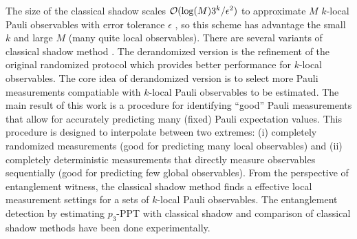 \documentclass[
aps,
pra,
twocolumn,
floatfix,
]{revtex4-2}
\theoremstyle{plain}
\theoremstyle{definition}
\newcommand{\dm}{\rho}
\begin{document}
The size of the classical shadow scales $\mathcal{O}(\log(M) 3^k/\epsilon^2)$ to approximate $M$ $k$-local Pauli observables with error tolerance $\epsilon$ \cite{huangPredictingManyProperties2020},
so this scheme has advantage the small $k$ and large $M$ (many quite local observables).
There are several variants of classical shadow method \cite{hadfieldMeasurementsQuantumHamiltonians2022, huangEfficientEstimationPauli2021, chenRobustShadowEstimation2021}.
The derandomized version \cite{huangEfficientEstimationPauli2021} is the refinement of the original randomized protocol which provides better performance for $k$-local observables. 
The core idea of derandomized version is to select more Pauli measurements compatiable with $k$-local Pauli observables to be estimated.
The main result of this work is a procedure for identifying “good” Pauli measurements that allow for accurately predicting many (ﬁxed) Pauli expectation values. This procedure is designed to interpolate between two extremes: (i) completely randomized measurements (good for predicting many local observables) and (ii) completely deterministic measurements that directly measure observables sequentially (good for predicting few global observables).
From the perspective of entanglement witness, the classical shadow method finds a effective local measurement settings for a sets of $k$-local Pauli observables.
The entanglement detection by estimating $p_3$-PPT with classical shadow \cite{elbenMixedstateEntanglementLocal2020} and comparison of classical shadow methods \cite{zhangExperimentalQuantumState2021} have been done experimentally.
\end{document}
